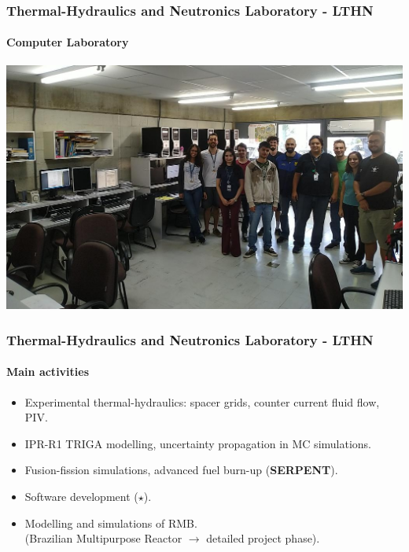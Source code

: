 \documentclass[svgnames,smaller,table]{beamer}
\begin{document}
\begin{frame}
  \frametitle{Thermal-Hydraulics and Neutronics Laboratory - LTHN}
  \framesubtitle{Computer Laboratory}
  \begin{center}
    \includegraphics[scale=0.3]{figuras/lthn-computers-cropped.jpg}
  \end{center}
\end{frame}

\begin{frame}
  \frametitle{Thermal-Hydraulics and Neutronics Laboratory - LTHN}
  \framesubtitle{Main activities}
  \begin{center}
    \begin{itemize}
    \item Experimental thermal-hydraulics: spacer grids, counter current fluid flow, PIV.
    \item IPR-R1 TRIGA modelling, uncertainty propagation in MC simulations.
    \item Fusion-fission simulations, advanced fuel burn-up (\textbf{SERPENT}).
    \item Software development ($\star$).
    \item Modelling and simulations of RMB.\\ (Brazilian Multipurpose Reactor $\rightarrow$ detailed project phase).
    \end{itemize}
  \end{center}
\end{frame}
\end{document}
